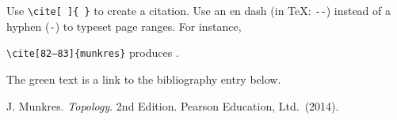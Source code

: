 \documentclass[a4paper,10pt,leqno]{article}
\numberwithin{equation}{section}
\theoremstyle{plain}
\theoremstyle{definition}
\theoremstyle{remark}
\begin{document}
Use \texttt{\textbackslash{}cite[ ]\{ \}} to create a citation.
Use an en dash (in \TeX: \texttt{-{}-}) instead of a hyphen (\texttt{-}) to typeset page ranges.
For instance,
\begin{center}
\texttt{\textbackslash{}cite[82--83]\{munkres\}}
produces
\cite[82--83]{munkres}.
\end{center}
The green text is a link to the bibliography entry below.


\frenchspacing
\begin{thebibliography}{11}
	J. Munkres.
	\textsl{Topology}.
	2nd Edition.
	Pearson Education, Ltd.\ (2014).
	
	
\end{thebibliography}
\end{document}
